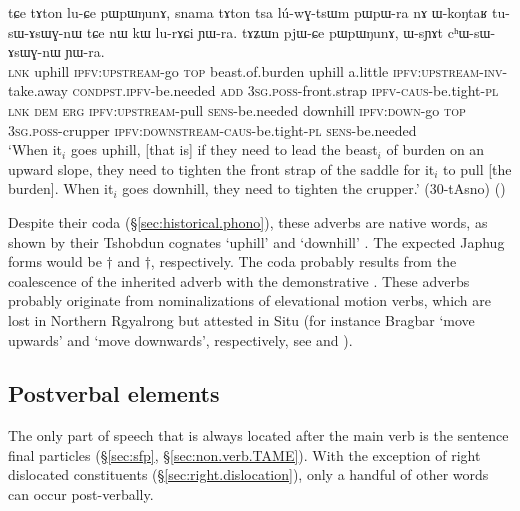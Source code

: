 \begin{exe}
\ex \label{ex:tAton.tAZWn}
\gll tɕe tɤton lu-ɕe pɯpɯŋunɤ, snama tɤton tsa lú-wɣ-tsɯm pɯ\redp{}pɯ-ra nɤ ɯ-koŋtaʁ tu-sɯ-ɤsɯɣ-nɯ tɕe nɯ kɯ lu-rɤɕi ɲɯ-ra.  tɤʑɯn pjɯ-ɕe pɯpɯŋunɤ, ɯ-sɲɤt cʰɯ-sɯ-ɤsɯɣ-nɯ ɲɯ-ra. \\
\textsc{lnk} uphill \textsc{ipfv}:\textsc{upstream}-go \textsc{top} beast.of.burden uphill a.little \textsc{ipfv}:\textsc{upstream}-\textsc{inv}-take.away \textsc{cond}\redp{}\textsc{pst}.\textsc{ipfv}-be.needed \textsc{add} \textsc{3sg}.\textsc{poss}-front.strap \textsc{ipfv}-\textsc{caus}-be.tight-\textsc{pl} \textsc{lnk} \textsc{dem} \textsc{erg} \textsc{ipfv}:\textsc{upstream}-pull \textsc{sens}-be.needed downhill \textsc{ipfv}:\textsc{down}-go \textsc{top} \textsc{3sg}.\textsc{poss}-crupper \textsc{ipfv}:\textsc{downstream}-\textsc{caus}-be.tight-\textsc{pl} \textsc{sens}-be.needed \\
\glt `When it$_i$ goes uphill, [that is] if they need to lead the beast$_i$ of burden on an upward slope, they need to tighten the front strap of the saddle for it$_i$ to pull [the burden]. When it$_i$ goes downhill, they need to tighten the crupper.'  (30-tAsno)
()
\end{exe}

Despite their  coda (§\ref{sec:historical.phono}), these adverbs are native words, as shown by their Tshobdun cognates  `uphill' and  `downhill' \citep[123--4]{jackson19tshobdun}. The expected Japhug forms would be $\dagger$ and $\dagger$, respectively. The coda  probably results from the coalescence of the inherited adverb with the demonstrative . These adverbs probably originate from nominalizations of elevational motion verbs, which are lost in Northern Rgyalrong but attested in Situ (for instance Bragbar  `move upwards' and
 `move downwards', respectively, see \citealt[§9.1]{zhangshuya20these} and \citealt{linyj17space}).

\subsection{Postverbal elements} \label{sec:postverbal.adv}
The only part of speech that is always located after the main verb is the sentence final particles (§\ref{sec:sfp}, §\ref{sec:non.verb.TAME}). With the exception of right dislocated constituents (§\ref{sec:right.dislocation}), only a handful of other words can occur post-verbally.

